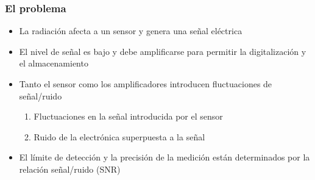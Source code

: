 \documentclass{beamer}
\begin{document}
\begin{frame}
\frametitle{El problema}
\begin{alertblock}{}
\begin{itemize}[<+->]
\item La radiación afecta a un sensor y genera una señal eléctrica

\item El nivel de señal es bajo y debe amplificarse para permitir la digitalización y
el almacenamiento

\item Tanto el sensor como los amplificadores introducen fluctuaciones de señal/ruido
\begin{enumerate}
\item Fluctuaciones en la señal introducida por el sensor
\item Ruido de la electrónica superpuesta a la señal
\end{enumerate}

\item El límite de detección y la precisión de la medición están
determinados por la relación señal/ruido (SNR)
\end{itemize}
\end{alertblock}

\end{frame}
\end{document}
